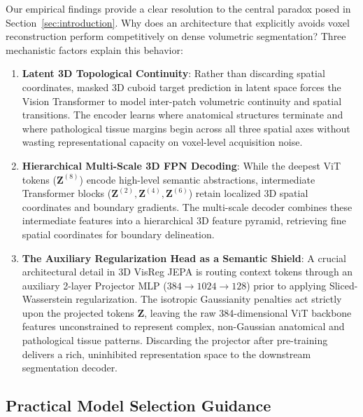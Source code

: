 \documentclass{article}
\begin{document}
Our empirical findings provide a clear resolution to the central paradox posed in Section~\ref{sec:introduction}. Why does an architecture that explicitly avoids voxel reconstruction perform competitively on dense volumetric segmentation? Three mechanistic factors explain this behavior:

\begin{enumerate}
    \item \textbf{Latent 3D Topological Continuity}: Rather than discarding spatial coordinates, masked 3D cuboid target prediction in latent space forces the Vision Transformer to model inter-patch volumetric continuity and spatial transitions. The encoder learns where anatomical structures terminate and where pathological tissue margins begin across all three spatial axes without wasting representational capacity on voxel-level acquisition noise.
    \item \textbf{Hierarchical Multi-Scale 3D FPN Decoding}: While the deepest ViT tokens ($\mathbf{Z}^{(8)}$) encode high-level semantic abstractions, intermediate Transformer blocks ($\mathbf{Z}^{(2)}, \mathbf{Z}^{(4)}, \mathbf{Z}^{(6)}$) retain localized 3D spatial coordinates and boundary gradients. The multi-scale decoder combines these intermediate features into a hierarchical 3D feature pyramid, retrieving fine spatial coordinates for boundary delineation.
    \item \textbf{The Auxiliary Regularization Head as a Semantic Shield}: A crucial architectural detail in 3D VisReg JEPA is routing context tokens through an auxiliary 2-layer Projector MLP ($384 \to 1024 \to 128$) prior to applying Sliced-Wasserstein regularization. The isotropic Gaussianity penalties act strictly upon the projected tokens $\mathbf{Z}$, leaving the raw 384-dimensional ViT backbone features unconstrained to represent complex, non-Gaussian anatomical and pathological tissue patterns. Discarding the projector after pre-training delivers a rich, uninhibited representation space to the downstream segmentation decoder.
\end{enumerate}

\subsection{Practical Model Selection Guidance}
\label{sec:practical_guidance}
\end{document}
